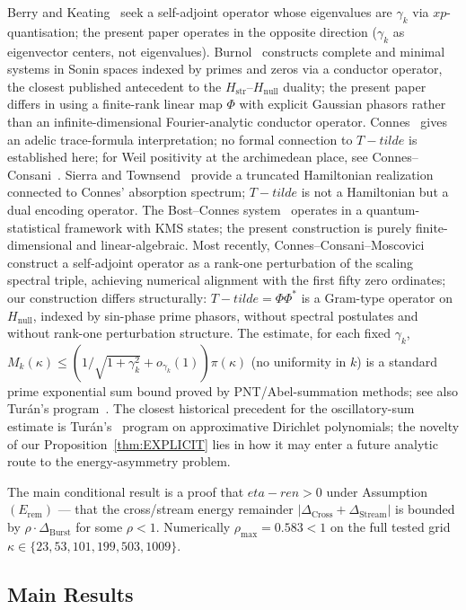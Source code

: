\documentclass[11pt]{article}
\def\Tt{T-tilde}%
\def\etaren{eta-ren}%
\newcommand{\Hstr}{H_{\mathrm{str}}}
\newcommand{\Hnull}{H_{\mathrm{null}}}
\newcommand{\etaren}{\eta_{\mathrm{ren}}}
\newcommand{\Tt}{\widetilde{T}}
\newcommand{\Dburstvar}{\Delta_{\mathrm{Burst}}}
\newcommand{\Dcross}{\Delta_{\mathrm{Cross}}}
\newcommand{\Dstream}{\Delta_{\mathrm{Stream}}}
\begin{document}
Berry and Keating~\cite{BerryKeating} seek a self-adjoint operator
whose eigenvalues are $\gamma_k$ via $xp$-quantisation; the present
paper operates in the opposite direction ($\gamma_k$ as eigenvector
centers, not eigenvalues).
Burnol~\cite{BurnolForum04} constructs complete and minimal systems
in Sonin spaces indexed by primes and zeros via a conductor operator,
the closest published antecedent to the $\Hstr$--$\Hnull$ duality;
the present paper differs in using a finite-rank linear map $\Phi$
with explicit Gaussian phasors rather than an
infinite-dimensional Fourier-analytic conductor operator.
Connes~\cite{Connes} gives an adelic trace-formula interpretation;
no formal connection to $\Tt$ is established here;
for Weil positivity at the archimedean place, see
Connes--Consani~\cite{ConnesConsani21}.
Sierra and Townsend~\cite{SierraTownsend} provide a truncated
Hamiltonian realization connected to Connes' absorption spectrum;
$\Tt$ is not a Hamiltonian but a dual encoding operator.
The Bost--Connes system~\cite{BostConnes} operates in a
quantum-statistical framework with KMS states; the present
construction is purely finite-dimensional and linear-algebraic.
Most recently, Connes--Consani--Moscovici~\cite{CCM25} construct
a self-adjoint operator as a rank-one perturbation of the
scaling spectral triple, achieving numerical alignment with the
first fifty zero ordinates; our construction differs structurally:
$\Tt=\Phi\Phi^*$ is a Gram-type operator on $\Hnull$, indexed
by sin-phase prime phasors, without spectral postulates and
without rank-one perturbation structure.
The estimate, for each fixed $\gamma_k$,
$M_k(\kappa)\le(1/\sqrt{1+\gamma_k^2}+o_{\gamma_k}(1))\pi(\kappa)$
(no uniformity in $k$) is a standard prime exponential sum bound
proved by PNT/Abel-summation methods; see also Tur\'an's program~\cite{Turan}.
The closest historical precedent for the oscillatory-sum estimate
is Tur\'an's~\cite{Turan} program on approximative Dirichlet
polynomials; the novelty of our Proposition~\ref{thm:EXPLICIT} lies in how it
may enter a future analytic route to the energy-asymmetry problem.

The main conditional result is a proof that $\etaren > 0$ under
Assumption $(E_{\mathrm{rem}})$ --- that the cross/stream energy remainder
$|\Dcross+\Dstream|$ is bounded by $\rho\cdot\Dburstvar$ for some $\rho<1$.
Numerically $\rho_{\max}=0.583<1$ on the full tested grid
$\kappa\in\{23,53,101,199,503,1009\}$.

\subsection{Main Results}
\end{document}
